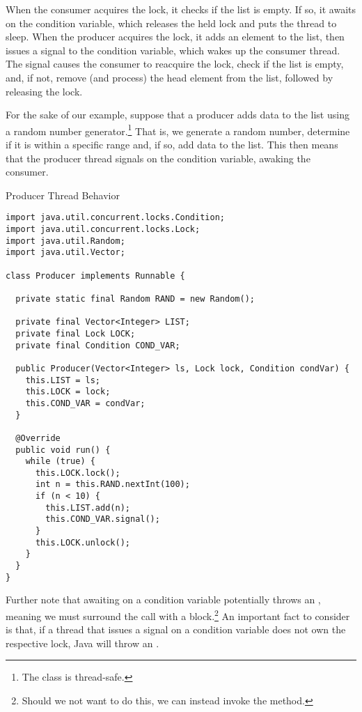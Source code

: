 When the consumer acquires the lock, it checks if the list is empty. If so, it awaits on the condition variable, which releases the held lock and puts the thread to sleep. When the producer acquires the lock, it adds an element to the list, then issues a signal to the condition variable, which wakes up the consumer thread. The signal causes the consumer to reacquire the lock, check if the list is empty, and, if not, remove (and process) the head element from the list, followed by releasing the lock.

For the sake of our example, suppose that a producer adds data to the list using a random number generator.\footnote{The  class is thread-safe.} That is, we generate a random number, determine if it is within a specific range and, if so, add data to the list. This then means that the producer thread signals on the condition variable, awaking the consumer.

\begin{cl}{Producer Thread Behavior}
\begin{lstlisting}[language=MyJava]
import java.util.concurrent.locks.Condition;
import java.util.concurrent.locks.Lock;
import java.util.Random;
import java.util.Vector;

class Producer implements Runnable {

  private static final Random RAND = new Random();

  private final Vector<Integer> LIST;
  private final Lock LOCK;
  private final Condition COND_VAR;

  public Producer(Vector<Integer> ls, Lock lock, Condition condVar) {
    this.LIST = ls;
    this.LOCK = lock;
    this.COND_VAR = condVar;
  }

  @Override
  public void run() {
    while (true) {
      this.LOCK.lock();
      int n = this.RAND.nextInt(100);
      if (n < 10) {
        this.LIST.add(n);
        this.COND_VAR.signal();
      }
      this.LOCK.unlock();
    }
  }
}
\end{lstlisting}
\end{cl}

Further note that awaiting on a condition variable potentially throws an , meaning we must surround the call with a  block.\footnote{Should we not want to do this, we can instead invoke the  method.} An important fact to consider is that, if a thread that issues a signal on a condition variable does not own the respective lock, Java will throw an .

